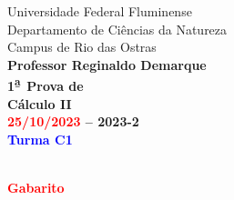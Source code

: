 \documentclass[a4paper,addpoints,12pt]{exam}
\newcommand{\fm}{\textsuperscript{\b{a}\ }}
\begin{document}
	

{\sc \scriptsize Universidade Federal Fluminense \\
Departamento de Ciências da Natureza\\
Campus de Rio das Ostras \\
\textbf{Professor Reginaldo Demarque}\\}
{\scriptsize 
\textbf{{\color{red} 1\fm Prova de}}\\
\textbf{Cálculo II}\\
\textbf{\textcolor{red}{25/10/2023} -- 2023-2}\\
\textbf{\textcolor{blue}{Turma C1}}\\
}
	
	
	\ifprintanswers
	\begin{center}
		\noindent \\
	{\Large \textbf{\textcolor{red}{Gabarito}}}\\
	\end{center}
	\noindent \hrulefill  
\end{document}
